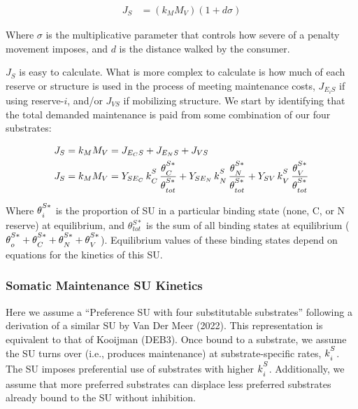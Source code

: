 \documentclass[
]{article}
\begin{document}
\begin{align} 
J_S &= (k_{\scriptscriptstyle M}M_V)(1 + d\sigma) 
\end{align}

Where \(\sigma\) is the multiplicative parameter that controls how
severe of a penalty movement imposes, and \(d\) is the distance walked
by the consumer.

\(J_S\) is easy to calculate. What is more complex to calculate is how
much of each reserve or structure is used in the process of meeting
maintenance costs, \(J_{{E_i}S}\) if using reserve-\(i\), and/or
\(J_{VS}\) if mobilizing structure. We start by identifying that the
total demanded maintenance is paid from some combination of our four
substrates:

\begin{align}
J_S &= {k_M}{M_V} = J_{{E_C}S} + J_{{E_N}S} + J_{VS}
\\
J_S &= {k_M}{M_V} = {Y_{S{E_C}}}\,{k\strut^S_C}\,\frac{\theta\strut^{S*}_C}{\theta\strut^{S*}_{tot}} + {Y_{S{E_N}}}\,{k\strut^S_N}\,\frac{\theta\strut^{S*}_N}{\theta\strut^{S*}_{tot}} +  {Y_{S{V}}}\,{k\strut^S_V}\,\frac{\theta\strut^{S*}_V}{\theta\strut^{S*}_{tot}}
\end{align}

Where \(\theta\strut^{S*}_i\) is the proportion of SU in a particular
binding state (none, C, or N reserve) at equilibrium, and
\(\theta^{S*}_{tot}\) is the sum of all binding states at equilibrium
(\(\theta\strut^{S*}_o + \theta\strut^{S*}_C + \theta\strut^{S*}_N+ \theta\strut^{S*}_V\)).
Equilibrium values of these binding states depend on equations for the
kinetics of this SU.

\newpage

\subsubsection{Somatic Maintenance SU
Kinetics}\label{somatic-maintenance-su-kinetics}

Here we assume a ``Preference SU with four substitutable substrates''
following a derivation of a similar SU by Van Der Meer (2022). This
representation is equivalent to that of Kooijman (DEB3). Once bound to a
substrate, we assume the SU turns over (i.e., produces maintenance) at
substrate-specific rates, \({k\strut^S_i}\). The SU imposes preferential
use of substrates with higher \({k\strut^S_i}\). Additionally, we assume
that more preferred substrates can displace less preferred substrates
already bound to the SU without inhibition.
\end{document}
